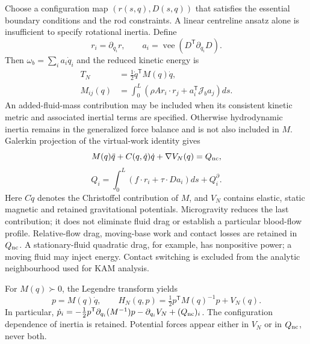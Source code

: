 Choose a configuration map $(r(s,q),D(s,q))$ that satisfies the essential
boundary conditions and the rod constraints. A linear centreline
ansatz alone is insufficient to specify rotational inertia. Define
\begin{equation}
 r_i=\partial_{q_i}r,\qquad
 a_i=\operatorname{vee}(D^{\mathsf T}\partial_{q_i}D).
\end{equation}
Then $\omega_b=\sum_i a_i\dot q_i$ and the reduced kinetic energy is
\begin{align}
 T_N&=\tfrac12\dot q^{\mathsf T}M(q)\dot q,\\
 M_{ij}(q)&=\int_0^L\left(\rho A r_i\cdot r_j+
                 a_i^{\mathsf T}\mathcal J_ba_j\right)ds.
\end{align}
An added-fluid-mass contribution may be included when its consistent
kinetic metric and associated inertial terms are specified. Otherwise
hydrodynamic inertia remains in the generalized force balance and is
not also included in $M$. Galerkin projection of the virtual-work
identity gives
\begin{equation}
 M(q)\ddot q+C(q,\dot q)\dot q+\nabla V_N(q)=Q_{\rm nc},
\end{equation}
\begin{equation}
 Q_i=\int_0^L(f\cdot r_i+\tau\cdot Da_i)ds+Q_i^\partial.
\end{equation}
Here $C\dot q$ denotes the Christoffel contribution of $M$, and $V_N$
contains elastic, static magnetic and retained gravitational potentials.
Microgravity reduces the last contribution; it does not eliminate
fluid drag or establish a particular blood-flow profile.
Relative-flow drag, moving-base work and contact losses are retained in
$Q_{\rm nc}$. A stationary-fluid quadratic drag, for example, has
nonpositive power; a moving fluid may inject energy. Contact switching
is excluded from the analytic neighbourhood used for KAM analysis.

For $M(q)\succ0$, the Legendre transform yields
\begin{equation}
 p=M(q)\dot q,\qquad
 H_N(q,p)=\tfrac12p^{\mathsf T}M(q)^{-1}p+V_N(q).
\end{equation}
In particular,
$\dot p_i=-\tfrac12p^{\mathsf T}\partial_{q_i}(M^{-1})p
-\partial_{q_i}V_N+(Q_{\rm nc})_i$.
The configuration dependence of inertia is retained. Potential forces
appear either in $V_N$ or in $Q_{\rm nc}$, never both.


